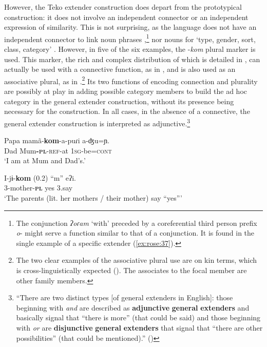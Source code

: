 \documentclass[output=paper]{langscibook}
\begin{document}
\newpage
However, the Teko extender construction does depart from the prototypical construction: it does not involve an independent connector or an independent expression of similarity. This is not surprising, as the language does not have an independent connector to link noun phrases \citep[146--150]{Rose2011},\footnote{The conjunction \textit{ʔoɾam} ‘with’ preceded by a coreferential third person prefix \textit{o}- might serve a function similar to that of a conjunction. It is found in the single example of a specific extender (\ref{ex:rose:37}).} nor nouns for ‘type, gender, sort, class, category’ \citep{CachineCachine2020}. However, in five of the six examples, the -\textit{kom} plural marker is used. This marker, the rich and complex distribution of which is detailed in \citet[55--56]{Rose2012}, can actually be used with a connective function, as in , and is also used as an associative plural, as in  .\footnote{The two clear examples of the associative plural use are on kin terms, which is cross-linguistically expected (\citealt{DanielMoravcsik2013}). The associates to the focal member are other family members.} Its two functions of encoding connection and plurality are possibly at play in adding possible category members to build the ad hoc category in the general extender construction, without its presence being necessary for the construction. In all cases, in the absence of a connective, the general extender construction is interpreted as adjunctive.\footnote{“There are two distinct types [of general extenders in English]: those beginning with \textit{and} are described as \textbf{adjunctive} \textbf{general} \textbf{extenders} and basically signal that “there is more” (that could be said) and those beginning with \textit{or} are \textbf{disjunctive} \textbf{general} \textbf{extenders} that signal that “there are other possibilities” (that could be mentioned).” (\citealt[1]{OverstreetOverstreet2021})}


\ea \label{ex:rose:38}
\gll Papa  mamã-\textbf{kom}{}-a-puɾi  a-ʤu=ɲ.\\
Dad  Mum\textbf{{}-}\textbf{\textsc{pl}}\textsc{-ref-}at  1\textsc{sg}-be=\textsc{cont}\\
\glt ‘I am at Mum and Dad’s.’ 
\z 


\ea \label{ex:rose:39}
\gll I-jɨ-\textbf{kom} (0.2) “m”  eʔi.\\
3-mother-\textbf{\textsc{pl}} {} yes  3.say\\
\glt ‘The parents (lit. her mothers / their mother) say “yes”’ 
\z
\end{document}
